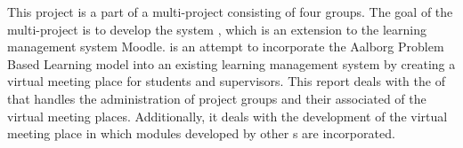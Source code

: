 This project is a part of a multi-project consisting of four groups.
The goal of the multi-project is to develop the system \system{}, which is an extension to the learning management system Moodle.
\system{} is an attempt to incorporate the Aalborg Problem Based Learning model into an existing learning management system by creating a virtual meeting place for students and supervisors.
This report deals with the \subsystem{} of \system{} that handles the administration of project groups and their associated of the virtual meeting places.
Additionally, it deals with the development of the virtual meeting place in which modules developed by other \subgroup{}s are incorporated.